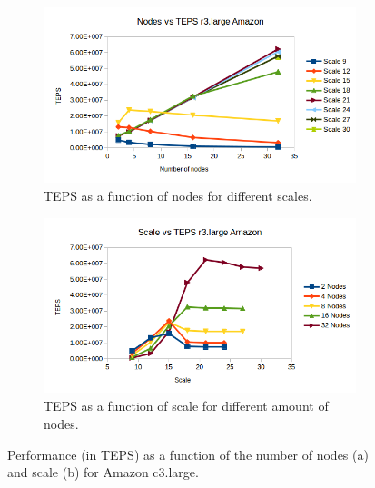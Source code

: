 \begin{figure}[!h]
	\centering
	\begin{subfigure}{.5\textwidth}
		\centering
		\includegraphics[width=\linewidth]{images/nodes_r3_amazon.png}
		\caption{TEPS as a function of nodes for different scales.}
		\label{fig:nodes_r3_amazon}
	\end{subfigure}%
	\begin{subfigure}{.5\textwidth}
		\centering
		\includegraphics[width=\linewidth]{images/scale_r3_amazon.png}
		\caption{TEPS as a function of scale for different amount of nodes.}
		\label{fig:scale_r3_amazon}
	\end{subfigure}
	\caption{Performance (in TEPS) as a function of the number of nodes (a) and scale (b) for Amazon c3.large.}
	\label{fig:r3_amazon}
\end{figure}
